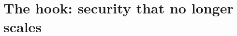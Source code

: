 \documentclass[aspectratio=169,10pt]{beamer}
\newcommand{\term}[1]{{\color{mlink}\textbf{#1}}}         %
\newcommand{\mlterm}[1]{{\color{accent}\textsf{\textbf{#1}}}} %
\begin{document}


\section{The hook: security that no longer scales}
\end{document}
